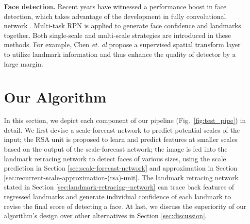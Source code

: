 \documentclass[10pt,twocolumn,letterpaper]{article}
\begin{document}
\textbf{Face detection.} Recent years have witnessed a  performance boost in  face detection, which takes 
 advantage of the development in fully convolutional network \cite{farfade2015multi,li2016face,yu2016unitbox,yang2015convolutional}.
%
%
Multi-task RPN is applied \cite{chen2016supervised,ranjan2016hyperface,sun2017face,hao2017scale} %
to generate face confidence and landmarks together. Both single-scale and multi-scale strategies are introduced in these methods.
For example, Chen \textit{et. al} \cite{chen2016supervised} propose a supervised spatial transform layer to utilize landmark information and %
thus enhance the quality of detector by a large margin.  
%


\section{Our Algorithm}\label{sec:our-algorithm}
In this section, we depict each component of our pipeline (Fig.~\ref{fig:test_pipe}) in detail. 
%
We first devise a scale-forecast network to predict potential scales of the input; 
%
the RSA unit is proposed to learn and predict  features at smaller scales  based on the output of the scale-forecast network;
%
the image is fed into the landmark retracing network to detect faces of various sizes, using the scale prediction in Section \ref{sec:scale-forecast-network} and approximation in Section \ref{sec:recurrent-scale-approximation-(rsa)-unit}. 
The landmark retracing network stated in Section \ref{sec:landmark-retracing--network} can trace back features of regressed landmarks and generate individual confidence of each landmark to revise the final score of detecting a face. 
At last, we discuss the superiority of our algorithm's design over other alternatives
in Section \ref{sec:discussion}.
\end{document}
